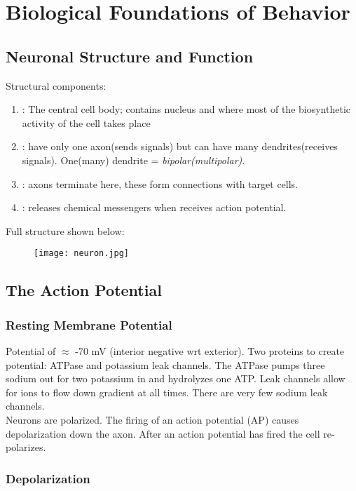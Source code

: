 \documentclass[../Psych_Soci_review.tex]{subfiles}
\begin{document}
\chapter{Biological Foundations of Behavior}

\section{Neuronal Structure and Function}

Structural components:
\begin{enumerate}
  \item {}: The central cell body; contains nucleus and where most of
    the biosynthetic activity of the cell takes place
  \item {}: have only one axon(sends signals) but can
    have many dendrites(receives signals). One(many) dendrite =
    \emph{bipolar(multipolar)}.
  \item {}: axons terminate here, these form connections
    with target cells.
  \item {}: releases chemical messengers when receives
    action potential.
\end{enumerate}
Full structure shown below:
\begin{figure}[h]
  \centering
  \texttt{[image: neuron.jpg]}
\end{figure}

\section{The Action Potential}
\subsection{Resting Membrane Potential}

Potential of $ \approx $ -70 mV (interior negative wrt exterior). Two proteins
to create potential:  ATPase and potassium leak channels.
The ATPase pumps three sodium out for two potassium in and hydrolyzes one ATP.
Leak channels allow for ions to flow down gradient at all times. There are very
few sodium leak channels.\\
Neurons are polarized. The firing of an action potential (AP) causes
depolarization down the axon. After an action potential has fired the cell
re-polarizes.

\subsection{Depolarization}
\end{document}
